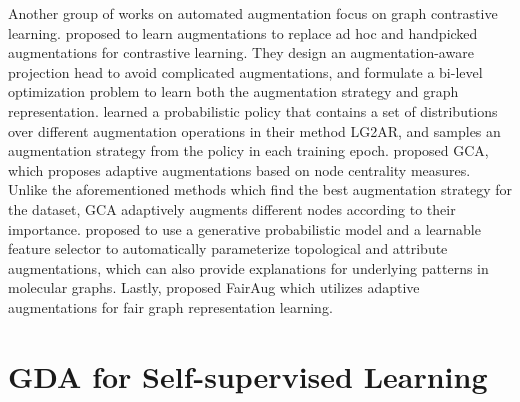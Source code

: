 \documentclass[11pt]{article}
\begin{document}
Another group of works on automated augmentation focus on graph contrastive learning. \citet{you2021graph} proposed to learn augmentations to replace ad hoc and handpicked augmentations for contrastive learning. They design an augmentation-aware projection head to avoid complicated augmentations, and formulate a bi-level optimization problem to learn both the augmentation strategy and graph representation. \citet{hassani2022learning} learned a probabilistic policy that contains a set of distributions over different augmentation operations in their method LG2AR, and samples an augmentation strategy from the policy in each training epoch. 
\citet{zhu2021graph} proposed GCA, which proposes adaptive augmentations based on node centrality measures. Unlike the aforementioned methods which find the best augmentation strategy for the dataset, GCA adaptively augments different nodes according to their importance. \citet{wang2021molecular} proposed to use a generative probabilistic model and a learnable feature selector to automatically parameterize topological and attribute augmentations, which can also provide explanations for underlying patterns in molecular graphs. Lastly, \citet{kose2022fair} proposed FairAug which utilizes adaptive augmentations for fair graph representation learning.



\section{GDA for Self-supervised Learning}
\label{sec:tong_application}
\end{document}
